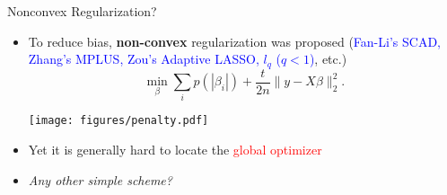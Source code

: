 \documentclass[slidestop,compress,9pt,epsfig,color]{beamer}
\theoremstyle{example}
\providecommand{\subitem}{\\ \textcolor{yellow}{$\bullet\ $}}
\begin{document}
\begin{frame}{Nonconvex Regularization?}
\begin{itemize}
\item To reduce bias, \textbf{non-convex} regularization was proposed (\textcolor{blue}{Fan-Li's SCAD, Zhang's MPLUS, Zou's Adaptive LASSO, $l_q$ ($q<1$)}, etc.) 
\[ \min_\beta \sum_{i} p(|\beta_i|)+\frac{t}{2n}\| y - X\beta \|_2^2. \]
\begin{center}
      \begin{minipage}[b]{0.3\textwidth}
      \centering
      \texttt{[image: figures/penalty.pdf]} \\
     \end{minipage}
\end{center}
\item Yet it is generally hard to locate the \textcolor{red}{global optimizer}
\item \emph{Any other simple scheme?}
\end{itemize}
\end{frame}

\end{document}
